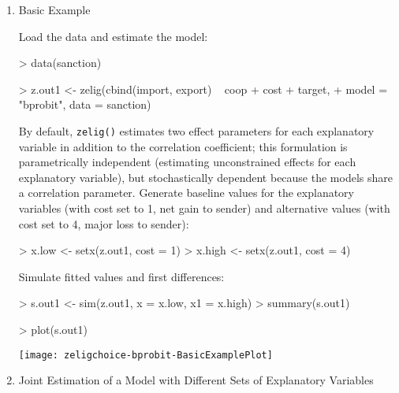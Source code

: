 \documentclass{article}
\begin{document}
\begin{enumerate}

\item {Basic Example} \label{basic.bp}

Load the data and estimate the model:  
\begin{Schunk}
\begin{Sinput}
>  data(sanction)
\end{Sinput}
\end{Schunk}
\begin{Schunk}
\begin{Sinput}
>  z.out1 <- zelig(cbind(import, export) ~ coop + cost + target, 
+                   model = "bprobit", data = sanction)
\end{Sinput}
\end{Schunk}
By default, {\tt zelig()} estimates two effect parameters
for each explanatory variable in addition to the correlation coefficient;
this formulation is parametrically independent (estimating
unconstrained effects for each explanatory variable), but
stochastically dependent because the models share a correlation parameter.
\newline \newline Generate baseline values for the explanatory
variables (with cost set to 1, net gain to sender) and alternative
values (with cost set to 4, major loss to sender):
\begin{Schunk}
\begin{Sinput}
>  x.low <- setx(z.out1, cost = 1)
>  x.high <- setx(z.out1, cost = 4)
\end{Sinput}
\end{Schunk}
Simulate fitted values and first differences:  
\begin{Schunk}
\begin{Sinput}
>  s.out1 <- sim(z.out1, x = x.low, x1 = x.high)
>  summary(s.out1)
\end{Sinput}
\end{Schunk}
\begin{center}
\begin{Schunk}
\begin{Sinput}
>  plot(s.out1)
\end{Sinput}
\end{Schunk}
\texttt{[image: zeligchoice-bprobit-BasicExamplePlot]}
\end{center}


\item {Joint Estimation of a Model with Different Sets of Explanatory Variables}\label{sto.dep.probit}


\end{enumerate}
\end{document}
